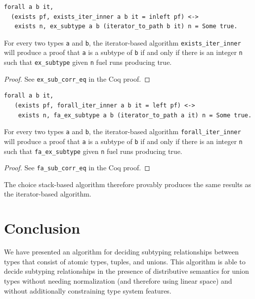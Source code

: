 \documentclass[a4paper,english]{lipics-v2019}
\begin{document}
\begin{lemma}
\begin{small}\begin{verbatim}
forall a b it, 
  (exists pf, exists_iter_inner a b it = inleft pf) <->
   exists n, ex_subtype a b (iterator_to_path b it) n = Some true.
\end{verbatim}\end{small}
For every two types \verb|a| and \verb|b|, the iterator-based algorithm
\verb|exists_iter_inner| will produce a proof that \verb|a| is a subtype
of \verb|b| if and only if there is an integer \verb|n| such that
 \verb|ex_subtype| given \verb|n| fuel runs producing true.
\end{lemma}
\begin{proof}
See \verb|ex_sub_corr_eq| in the Coq proof.
\end{proof}

\begin{lemma}
\begin{small}\begin{verbatim}
forall a b it,
   (exists pf, forall_iter_inner a b it = left pf) <->
    exists n, fa_ex_subtype a b (iterator_to_path a it) n = Some true.
\end{verbatim}
\end{small}  
For every two types \verb|a| and \verb|b|, the iterator-based algorithm
\verb|forall_iter_inner| will produce a proof that \verb|a| is a subtype
of \verb|b| if and only if there is an integer \verb|n| such that
 \verb|fa_ex_subtype| given \verb|n| fuel runs producing true.
\end{lemma}
\begin{proof}
See \verb|fa_sub_corr_eq| in the Coq proof.
\end{proof}

The choice stack-based algorithm therefore provably produces the same results
as the iterator-based algorithm. 

\section{Conclusion}

We have presented an algorithm for deciding subtyping relationships between
types that consist of atomic types, tuples, and unions. This algorithm is able
to decide subtyping relationships in the presence of distributive semantics
for union types without needing normalization (and therefore using linear
space) and without additionally constraining type system features.

%

\end{document}
